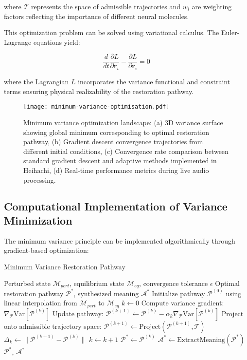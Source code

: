 \documentclass[12pt,a4paper]{article}
\begin{document}
where $\mathcal{T}$ represents the space of admissible trajectories and $w_i$ are weighting factors reflecting the importance of different neural molecules.

This optimization problem can be solved using variational calculus. The Euler-Lagrange equations yield:

\begin{equation}
\frac{d}{dt} \frac{\partial L}{\partial \dot{\mathbf{r}}_i} - \frac{\partial L}{\partial \mathbf{r}_i} = 0
\end{equation}

where the Lagrangian $L$ incorporates the variance functional and constraint terms ensuring physical realizability of the restoration pathway.

\begin{figure}[h]
\centering
\texttt{[image: minimum-variance-optimisation.pdf]}
\caption{Minimum variance optimization landscape: (a) 3D variance surface showing global minimum corresponding to optimal restoration pathway, (b) Gradient descent convergence trajectories from different initial conditions, (c) Convergence rate comparison between standard gradient descent and adaptive methods implemented in Heihachi, (d) Real-time performance metrics during live audio processing.}
\label{fig:minimum-variance-optimisation}
\end{figure}

\subsection{Computational Implementation of Variance Minimization}

The minimum variance principle can be implemented algorithmically through gradient-based optimization:

\begin{algorithm}
\caption{Minimum Variance Restoration Pathway}
\begin{algorithmic}[1]
\REQUIRE Perturbed state $\mathcal{M}_{pert}$, equilibrium state $\mathcal{M}_{eq}$, convergence tolerance $\epsilon$
\ENSURE Optimal restoration pathway $\mathcal{P}^*$, synthesized meaning $\mathcal{A}^*$
\STATE Initialize pathway $\mathcal{P}^{(0)}$ using linear interpolation from $\mathcal{M}_{pert}$ to $\mathcal{M}_{eq}$
\STATE $k \leftarrow 0$
\REPEAT
    \STATE Compute variance gradient: $\nabla_{\mathcal{P}} \text{Var}[\mathcal{P}^{(k)}]$
    \STATE Update pathway: $\mathcal{P}^{(k+1)} \leftarrow \mathcal{P}^{(k)} - \alpha_k \nabla_{\mathcal{P}} \text{Var}[\mathcal{P}^{(k)}]$
    \STATE Project onto admissible trajectory space: $\mathcal{P}^{(k+1)} \leftarrow \text{Project}(\mathcal{P}^{(k+1)}, \mathcal{T})$
    \STATE $\Delta_k \leftarrow \| \mathcal{P}^{(k+1)} - \mathcal{P}^{(k)} \|$
    \STATE $k \leftarrow k + 1$
\STATE $\mathcal{P}^* \leftarrow \mathcal{P}^{(k)}$
\STATE $\mathcal{A}^* \leftarrow \text{ExtractMeaning}(\mathcal{P}^*)$
\RETURN $\mathcal{P}^*$, $\mathcal{A}^*$
\end{algorithmic}
\end{algorithm}
\end{document}
